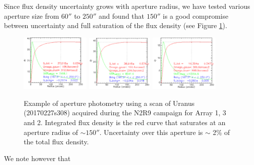 Since flux density uncertainty grows with aperture radius, we have
tested various aperture size from $60''$ to $250''$ and found that
$150''$ is a good compromise between
uncertainty and full saturation of the flux density (see Figure
\ref{fig:Uranus_s308}).
%
\begin{figure}[!htbp]
  \begin{center}
    \includegraphics[clip=true,width=0.3\textwidth]{Figures/Aperture_photo/ura_a1.png}
    \includegraphics[clip=true,width=0.293\textwidth]{Figures/Aperture_photo/ura_a3.png}
    \includegraphics[clip=true,width=0.3\textwidth]{Figures/Aperture_photo/ura_a2.png}
    \caption[Aperture photometry of Uranus]{Example of aperture photometry using a scan of Uranus (20170227s308) acquired during the N2R9 campaign for Array 1, 3 and 2. Integrated flux density is the red curve that saturates at an aperture radius of $ \sim 150''$. Uncertainty over this aperture is $\sim$ 2\% of the total flux density. }
    \label{fig:Uranus_s308}
  \end{center}
\end{figure}

We note however that 

